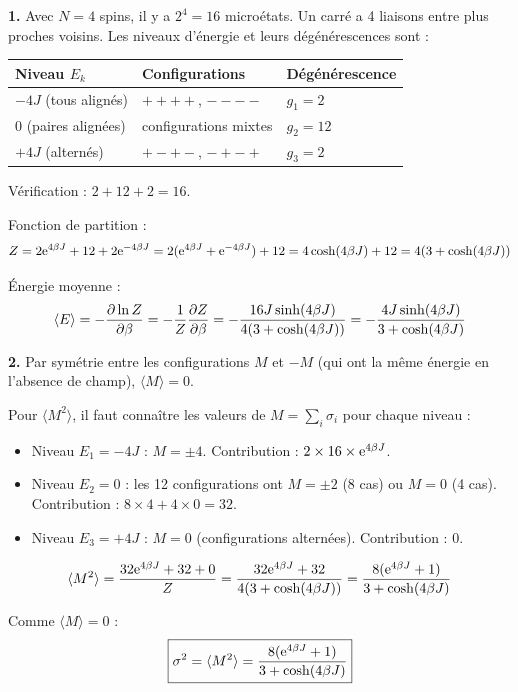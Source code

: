 \documentclass[12pt,a4paper]{article}
\begin{document}
\begin{boitecorrige}
\textbf{1.} Avec $N=4$ spins, il y a $2^4 = 16$ microétats. Un carré a 4 liaisons entre plus proches voisins. Les niveaux d'énergie et leurs dégénérescences sont :

\begin{center}
\small
\begin{tabular}{lll}
\toprule
Niveau $E_k$ & Configurations & Dégénérescence \\
\midrule
$-4J$ (tous alignés) & $++++$, $----$ & $g_1 = 2$ \\
$0$ (paires alignées) & configurations mixtes & $g_2 = 12$ \\
$+4J$ (alternés) & $+-+-$, $-+-+$ & $g_3 = 2$ \\
\bottomrule
\end{tabular}
\end{center}

Vérification : $2 + 12 + 2 = 16$.

Fonction de partition :
\[
Z = 2\mathrm{e}^{4\beta J} + 12 + 2\mathrm{e}^{-4\beta J} = 2(\mathrm{e}^{4\beta J}+\mathrm{e}^{-4\beta J}) + 12 = 4\cosh(4\beta J) + 12 = 4(3+\cosh(4\beta J))
\]

Énergie moyenne :
\[
\langle E\rangle = -\dfrac{\partial \ln Z}{\partial \beta} = -\frac{1}{Z}\dfrac{\partial Z}{\partial \beta} = -\frac{16J\sinh(4\beta J)}{4(3+\cosh(4\beta J))} = -\frac{4J\sinh(4\beta J)}{3+\cosh(4\beta J)}
\]

\textbf{2.} Par symétrie entre les configurations $M$ et $-M$ (qui ont la même énergie en l'absence de champ), $\langle M\rangle = 0$.

Pour $\langle M^2\rangle$, il faut connaître les valeurs de $M = \sum_i\sigma_i$ pour chaque niveau :
\begin{itemize}
  \item Niveau $E_1=-4J$ : $M = \pm4$. Contribution : $2\times16\times\mathrm{e}^{4\beta J}$.
  \item Niveau $E_2=0$ : les 12 configurations ont $M = \pm2$ (8 cas) ou $M=0$ (4 cas). Contribution : $8\times4 + 4\times0 = 32$.
  \item Niveau $E_3=+4J$ : $M = 0$ (configurations alternées). Contribution : $0$.
\end{itemize}
\[
\langle M^2\rangle = \frac{32\mathrm{e}^{4\beta J} + 32 + 0}{Z} = \frac{32\mathrm{e}^{4\beta J}+32}{4(3+\cosh(4\beta J))}= \frac{8(\mathrm{e}^{4\beta J}+1)}{3+\cosh(4\beta J)}
\]

Comme $\langle M\rangle = 0$ :
\[
\boxed{\sigma^2 = \langle M^2\rangle = \frac{8(\mathrm{e}^{4\beta J}+1)}{3+\cosh(4\beta J)}}
\]


\end{boitecorrige}
\end{document}
